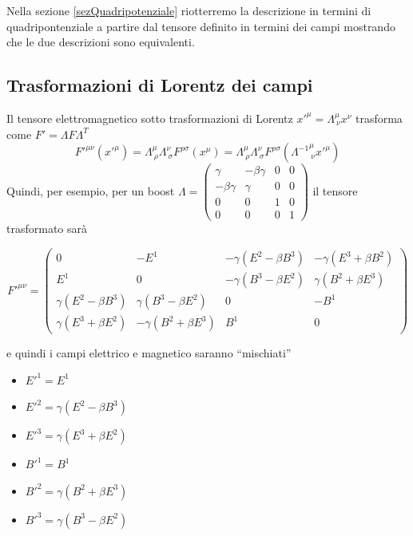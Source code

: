\documentclass[12pt,a4paper,titlepage, twoside, openright]{book}
\numberwithin{equation}{chapter}
\begin{document}
Nella sezione \ref{sezQuadripotenziale} riotterremo la descrizione in termini di quadripontenziale a partire dal tensore definito in termini dei campi mostrando che le due descrizioni sono equivalenti.
\subsection{Trasformazioni di Lorentz dei campi}

Il tensore elettromagnetico sotto trasformazioni di Lorentz $x'^\mu=\Lambda^\mu_{\>\nu}x^\nu$ trasforma come $F'=\Lambda F \Lambda^T$ 
\[
F'^{\mu\nu}(x'^\mu)=\Lambda^\mu_{\>\rho} \Lambda^\nu_{\>\sigma} F^{\rho\sigma}(x^\mu) = 
\Lambda^\mu_{\>\rho} \Lambda^\nu_{\>\sigma} F^{\rho\sigma}(\left.\Lambda^{-1}\right.^\mu_{\>\nu}x'^\mu)
\]
Quindi, per esempio, per un boost $\Lambda=\left(\begin{array}{cccc}\gamma & -\beta\gamma & 0 & 0 \\ -\beta\gamma & \gamma & 0 & 0 \\ 0 & 0 & 1 & 0 \\ 0 & 0 & 0 & 1\end{array}\right)$
il tensore trasformato sarà

\begin{equation}
F'^{\mu\nu}=\left(\begin{array}{cccc}
0 & -E^1 & -\gamma(E^2-\beta B^3) & -\gamma (E^3+\beta B^2) \\
E^1 & 0 & -\gamma(B^3-\beta E^2) & \gamma (B^2+\beta E^3) \\
\gamma(E^2-\beta B^3) & \gamma (B^3-\beta E^2) & 0 & -B^1 \\
\gamma(E^3+\beta E^2) & -\gamma(B^2+\beta E^3) & B^1 & 0 
\end{array}\right)
\end{equation}
\par
e quindi i campi elettrico e magnetico saranno ``mischiati''\par
\begin{minipage}[H]{0.45\linewidth}
\begin{itemize}[label=$\cdot$]
\item $E'^1=E^1$ 
\item $E'^2=\gamma(E^2-\beta B^3)$
\item $E'^3=\gamma(E^3+\beta E^2)$
\end{itemize}
\end{minipage}
\begin{minipage}[H]{0.45\linewidth}
\begin{itemize}[label=$\cdot$]
\item $B'^1=B^1$ 
\item $B'^2=\gamma(B^2+\beta E^3)$
\item $B'^3=\gamma(B^3-\beta E^2)$
\end{itemize}
\end{minipage}
\end{document}
